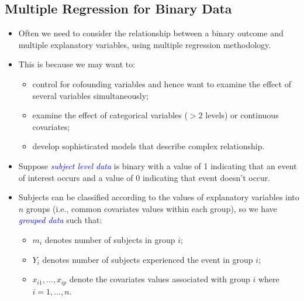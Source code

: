 \documentclass[oneside]{book}\usepackage[]{graphicx}\usepackage[svgnames]{xcolor}
\begin{document}
\subsection*{Multiple Regression for Binary Data}
\begin{itemize}
      \item Often we need to consider the relationship between a binary outcome and
            multiple explanatory variables, using multiple regression methodology.
      \item This is because we may want to:
            \begin{itemize}
                  \item control for cofounding variables and hence want to examine the effect of
                        several variables simultaneously;
                  \item examine the effect of categorical variables ($ >2 $ levels) or continuous covariates;
                  \item develop sophisticated models that describe complex relationship.
            \end{itemize}
      \item Suppose \textcolor{Blue}{\emph{subject level data}} is binary with a value of 1 indicating that an event
            of interest occurs and a value of 0 indicating that event doesn't occur.
      \item Subjects can be classified according to the values of explanatory
            variables into $n$ groups (i.e., common covariates values within each group), so
            we have \textcolor{Blue}{\emph{grouped data}} such that:
            \begin{itemize}
                  \item $ m_i $ denotes number of subjects in group $i$;
                  \item $Y_i$ denotes number of subjects experienced the event in group $i$;
                  \item $ x_{i1},\ldots,x_{ip} $ denote the covariates values associated with group $i$
                        where $ i=1,\ldots,n $.
            \end{itemize}
\end{itemize}
\end{document}
